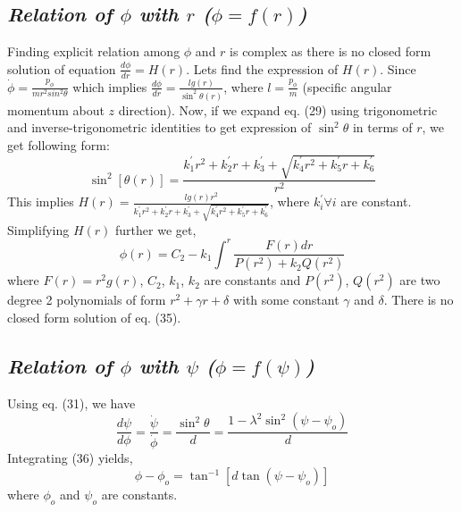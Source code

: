 \documentclass[conference]{IEEEtran}
\begin{document}
\subsection{\normalsize{\emph{\textbf{Relation of $\phi$ with $r$ ($\phi = f(r)$)}}}}
Finding explicit relation among $\phi$ and $r$ is complex as there is no closed form solution of equation $\frac{d\phi}{d r} = H(r)$. Lets find the expression of $H(r)$. Since $\dot{\phi} = \frac{p_{\phi}}{mr^{2}sin^{2}{\theta}}$ which implies $\frac{d \phi}{d r} = \frac{lg(r)}{\sin^{2}{\theta(r)}}$, where $l = \frac{p_{\phi}}{m}$ (specific angular momentum about $z$ direction). Now, if we expand eq. (29) using trigonometric and inverse-trigonometric identities to get expression of $\sin^{2}{\theta}$ in terms of $r$, we get following form:  \begin{dmath}
\sin^{2}{\left[\theta(r)\right]} = \frac{k_{1}^{'}r^{2} + k_{2}^{'}r + k_{3}^{'} + \sqrt{k_{4}^{'}r^{2} + k_{5}^{'}r + k_{6}^{'}}}{r^{2}}
\end{dmath} 
This implies $H(r) = \frac{lg(r)r^{2}}{k_{1}^{'}r^{2} + k_{2}^{'}r + k_{3}^{'} + \sqrt{k_{4}^{'}r^{2} + k_{5}^{'}r + k_{6}^{'}}}$, where $k_{i}^{'} \forall{i}$ are constant. Simplifying $H(r)$ further we get, \begin{dmath} \phi(r) = C_{2} - k_{1}\int^{r}\frac{F(r) dr}{P(r^{2}) + k_{2}Q(r^{2})}\end{dmath} where $F(r) = r^{2}g(r)$, $C_{2}$, $k_{1}$, $k_{2}$ are constants and $P(r^{2})$, $Q(r^{2})$ are two degree 2 polynomials of form $r^{2} + \gamma r + \delta$ with some constant $\gamma$ and $\delta$. There is no closed form solution of eq. (35). 
\vspace{1em}




\subsection{\normalsize{\emph{\textbf{Relation of $\phi$ with $\psi$ ($\phi = f(\psi)$)}}}}
Using eq. (31), we have \begin{equation}
\frac{d \psi}{d \phi} = \frac{\dot{\psi}}{\dot{\phi}} = \frac{\sin^{2}{\theta}}{d} = \frac{1 - \lambda^{2}\sin^{2}{\left(\psi - \psi_{o}\right)}}{d}
\end{equation}
Integrating (36) yields, \begin{equation}
    \phi - \phi_{o} = \tan^{-1}{\left[d\tan{\left(\psi - \psi_{o}\right)}\right]}
\end{equation}where $\phi_{o}$ and $\psi_{o}$ are constants.
\vspace{1em}
\end{document}
